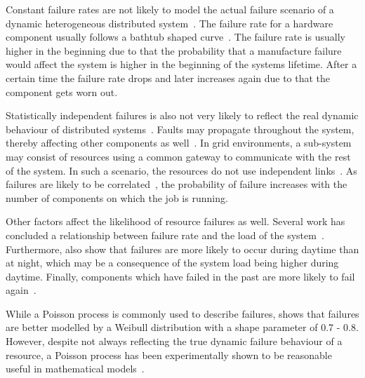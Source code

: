 \documentclass{cslthse-msc}
\begin{document}

Constant failure rates are not likely to model the actual failure scenario of a dynamic heterogeneous distributed system~\cite{algoMinExTime}. The failure rate for a hardware component usually follows a bathtub shaped curve~\cite{surveyReliabilityDistr}. The failure rate is usually higher in the beginning due to that the probability that a manufacture failure would affect the system is higher in the beginning of the systems lifetime. After a certain time the failure rate drops and later increases again due to that the component gets worn out.

Statistically independent failures is also not very likely to reflect the real dynamic behaviour of distributed systems~\cite{surveyReliabilityDistr, cloudServiceRel}. Faults may propagate throughout the system, thereby affecting other components as well~\cite{relGridSystems}. In grid environments, a sub-system may consist of resources using a common gateway to communicate with the rest of the system. In such a scenario, the resources do not use independent links~\cite{optResourceAllMaxPerformance}. As failures are likely to be correlated~\cite{perfImplPerCheckPoint}, the probability of failure increases with the number of components on which the job is running.

Other factors affect the likelihood of resource failures as well. Several work has concluded a relationship between failure rate and the load of the system~\cite{studyOfFailures, implicationsOfFailures}. Furthermore, \cite{studyOfFailures, implicationsOfFailures} also show that failures are more likely to occur during daytime than at night, which may be a consequence of the system load being higher during daytime. Finally, components which have failed in the past are more likely to fail again~\cite{implicationsOfFailures}.

While a Poisson process is commonly used to describe failures, \cite{studyOfFailures} shows that failures are better modelled by a Weibull distribution with a shape parameter of 0.7 - 0.8. However, despite not always reflecting the true dynamic failure behaviour of a resource, a Poisson process has been experimentally shown to be reasonable useful in mathematical models~\cite{experimentalFailureAssessment}.
\end{document}
